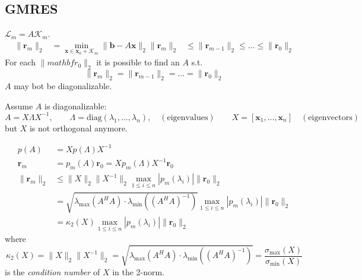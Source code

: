 \subsection{GMRES}
$\mathcal{L}_m = A\mathcal{K}_m$.
\begin{align*}
    \|\mathbf{r}_m\|_2 & = \min_{\mathbf{x} \in \mathbf{x}_0 + \mathcal{K}_m} \|\mathbf{b} - A\mathbf{x}\|_2
    \|\mathbf{r}_m\|_2 & \leq \|\mathbf{r}_{m-1}\|_2 \leq \ldots \leq \|\mathbf{r}_0\|_2
\end{align*}
For each $\|mathbf{r}_0\|_2$ it is possible to find an $A$ s.t.
\[
    \|\mathbf{r}_m\|_2 = \|\mathbf{r}_{m-1}\|_2 = \ldots = \|\mathbf{r}_0\|_2
\]
$A$ may bot be diagonalizable.

Assume $A$ is diagonalizable:
\[
    A = X\Lambda X^{-1}, \qquad \Lambda = \text{diag}(\lambda_1, \ldots, \lambda_n), \quad (\text{eigenvalues})
    \qquad X = [\mathbf{x}_1, \ldots, \mathbf{x}_n] \quad (\text{eigenvectors})
\]
but $X$ is not orthogonal anymore.


\begin{align*}
    p(A) & = Xp(\Lambda)X^{-1} \\
    \mathbf{r}_m & = p_m(A)\mathbf{r}_0 = Xp_m(\Lambda)X^{-1}\mathbf{r}_0 \\
    \|\mathbf{r}_m\|_2 & \leq \|X\|_2 \|X^{-1}\|_2 \max_{1 \leq i \leq n} |p_m(\lambda_i)| \|\mathbf{r}_0\|_2 \\
    & = \sqrt{\lambda_{\max}(A^H A) \cdot \lambda_{\min}((A^H A)^{-1})} \max_{1 \leq i \leq n} |p_m(\lambda_i)| \|\mathbf{r}_0\|_2 \\
    & = \kappa_2(X) \max_{1 \leq i \leq n} |p_m(\lambda_i)| \|\mathbf{r}_0\|_2
\end{align*}
where
\[
\kappa_2(X) = \|X\|_2 \|X^{-1}\|_2 = \sqrt{\lambda_{\max}(A^H A)\cdot \lambda_{\min}((A^H A)^{-1})} = \frac{\sigma_{\max}(X)}{\sigma_{\min}(X)}
\]
is the \emph{condition number} of $X$ in the 2-norm.


